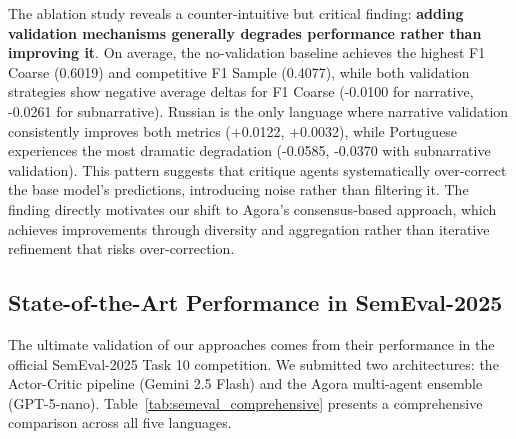 The ablation study reveals a counter-intuitive but critical finding: \textbf{adding validation mechanisms generally degrades performance rather than improving it}. On average, the no-validation baseline achieves the highest F1 Coarse (0.6019) and competitive F1 Sample (0.4077), while both validation strategies show negative average deltas for F1 Coarse (-0.0100 for narrative, -0.0261 for subnarrative). Russian is the only language where narrative validation consistently improves both metrics (+0.0122, +0.0032), while Portuguese experiences the most dramatic degradation (-0.0585, -0.0370 with subnarrative validation). This pattern suggests that critique agents systematically over-correct the base model's predictions, introducing noise rather than filtering it. The finding directly motivates our shift to Agora's consensus-based approach, which achieves improvements through diversity and aggregation rather than iterative refinement that risks over-correction.

\subsection{State-of-the-Art Performance in SemEval-2025}

The ultimate validation of our approaches comes from their performance in the official SemEval-2025 Task 10 competition. We submitted two architectures: the Actor-Critic pipeline (Gemini 2.5 Flash) and the Agora multi-agent ensemble (GPT-5-nano). Table~\ref{tab:semeval_comprehensive} presents a comprehensive comparison across all five languages.

